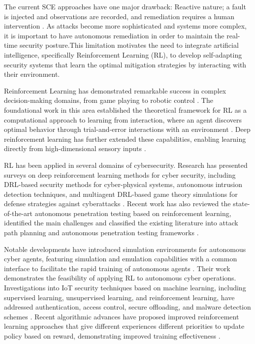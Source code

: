 \documentclass[conference,10pt]{IEEEtran}
\begin{document}
The current SCE approaches have one major drawback: Reactive nature; a fault is injected and observations are recorded, and remediation requires a human intervention \cite{owotogbe2025chaos}. As attacks become more sophisticated and systems more complex, it is important to have autonomous remediation in order to maintain the real-time security posture.This limitation motivates the need to integrate artificial intelligence, specifically Reinforcement Learning (RL), to develop self-adapting security systems that learn the optimal mitigation strategies by interacting with their environment. 

Reinforcement Learning has demonstrated remarkable success in complex decision-making domains, from game playing to robotic control \cite{silver2016mastering, schulman2017ppo}. The foundational work in this area established the theoretical framework for RL as a computational approach to learning from interaction, where an agent discovers optimal behavior through trial-and-error interactions with an environment \cite{sutton1998reinforcement}. Deep reinforcement learning has further extended these capabilities, enabling learning directly from high-dimensional sensory inputs \cite{mnih2015human}.

RL has been applied in several domains of cybersecurity. Research has presented surveys on deep reinforcement learning methods for cyber security, including DRL-based security methods for cyber-physical systems, autonomous intrusion detection techniques, and multiagent DRL-based game theory simulations for defense strategies against cyberattacks \cite{nguyen2021deep}. Recent work has also reviewed the state-of-the-art autonomous penetration testing based on reinforcement learning, identified the main challenges and classified the existing literature into attack path planning and autonomous penetration testing frameworks \cite{liu2025autonomous}. 

Notable developments have introduced simulation environments for autonomous cyber agents, featuring simulation and emulation capabilities with a common interface to facilitate the rapid training of autonomous agents \cite{standen2021cyborg}. Their work demonstrates the feasibility of applying RL to autonomous cyber operations. Investigations into IoT security techniques based on machine learning, including supervised learning, unsupervised learning, and reinforcement learning, have addressed authentication, access control, secure offloading, and malware detection schemes \cite{xiao2018iot}. Recent algorithmic advances have proposed improved reinforcement learning approaches that give different experiences different priorities to update policy based on reward, demonstrating improved training effectiveness \cite{zheng2025proximal}.
\end{document}

